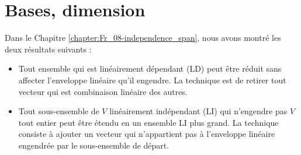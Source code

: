\chapter{Bases, dimension}\label{chapter:Fr_10-basisdimension}

Dans le Chapitre \ref{chapter:Fr_08-independence_span}, nous avons montré les deux résultats suivants :
\begin{itemize}
\item Tout ensemble qui est linéairement dépendant (LD) peut être réduit sans affecter l'enveloppe lin\'eaire qu'il engendre. La technique est de retirer tout vecteur qui est combinaison lin\'eaire des autres.
\item Tout sous-ensemble de $V$ linéairement indépendant (LI) qui n'engendre pas $V$ tout entier peut être \'etendu en un ensemble LI plus grand. La technique consiste à ajouter un vecteur qui n'appartient pas \`a l'enveloppe lin\'eaire engendr\'ee par le sous-ensemble de départ.
\end{itemize}

